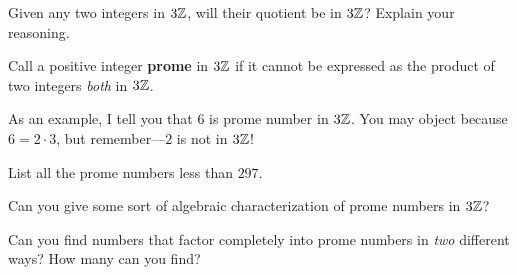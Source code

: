 \begin{prob}
Given any two integers in $3\mathbb Z$, will their quotient be in $3\mathbb Z$?
Explain your reasoning.
\end{prob}

\begin{definition}
Call a positive integer \textbf{prome} in $3\mathbb Z$ if it cannot be
expressed as the product of two integers \textit{both} in $3\mathbb Z$.
\end{definition}

As an example, I tell you that $6$ is prome number in $3\mathbb Z$. You may
object because $6 = 2\cdot 3$, but remember---$2$ is not in $3\mathbb Z$!


\begin{prob}
List all the prome numbers less than $297$.
\end{prob}

\begin{prob}
Can you give some sort of algebraic characterization of prome numbers
in $3\mathbb Z$? 
\end{prob}

\begin{prob}
Can you find numbers that factor completely into prome numbers in
\textit{two} different ways? How many can you find?
\end{prob}





